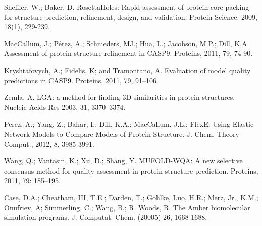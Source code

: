 \documentclass[12pt]{article}
\begin{document}
\begin{thebibliography}{99}
Sheffler, W.; Baker, D. RosettaHoles: Rapid assessment of protein core packing for structure prediction, refinement, design, and validation. Protein Science. 2009, 18(1), 229-239.


MacCallum, J.; Pérez, A.; Schnieders, MJ.; Hua, L.; Jacobson, M.P.; Dill, K.A. Assessment of protein structure refinement 
in CASP9. Proteins, 2011, 79, 74-90.

Kryshtafovych, A.; Fidelis, K; and Tramontano, A. Evaluation of model quality predictions in CASP9. Proteins, 2011, 79, 91–106

Zemla, A. LGA: a method for finding 3D similarities in protein structures. Nucleic Acids Res 2003, 31, 3370–3374.


Perez, A.; Yang, Z.; Bahar, I.; Dill, K.A.; MacCallum, J.L.; FlexE: Using Elastic Network Models to Compare Models of Protein Structure. J. Chem. Theory Comput., 2012, 8, 3985-3991. 

Wang, Q.; Vantasin, K.; Xu, D.; Shang, Y. MUFOLD-WQA: A new selective consensus method for quality assessment in protein structure prediction. 
Proteins, 2011, 79: 185–195. 

Case, D.A.; Cheatham, III, T.E.; Darden, T.; Gohlke, Luo, H.R.; Merz, Jr., K.M.;  Onufriev, A; Simmerling, C.; 
Wang, B.; R. Woods, R. The Amber biomolecular simulation programs. J. Computat. Chem. (20005) 26, 1668-1688.



\end{thebibliography}
\end{document}

